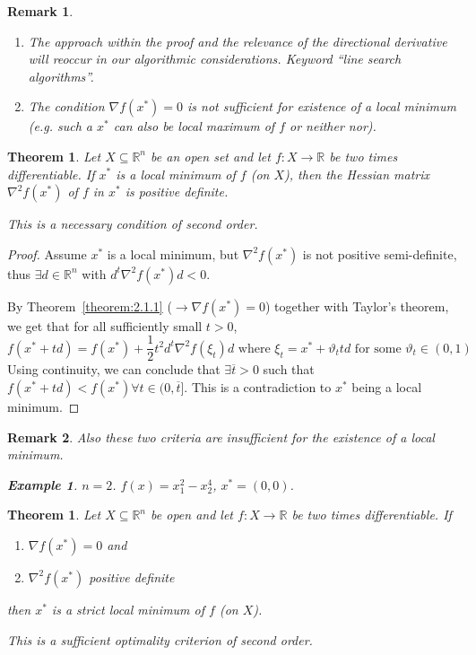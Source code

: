 \documentclass[a4paper]{article}
\newcounter{lecref}[subsection]
\numberwithin{lecref}{subsection}
\newtheorem{theorem}[lecref]{Theorem}
\newtheorem*{Example}{Example}
\newtheorem*{Remark}{Remark}
\begin{document}
\begin{Remark}
	\begin{enumerate}
		\item The approach within the proof and the relevance of the directional derivative will reoccur in our algorithmic considerations. Keyword \enquote{line search algorithms}.
		\item The condition $\nabla f(x^*) = 0$ is not sufficient for existence of a local minimum (e.g. such a $x^*$ can also be local maximum of $f$ or neither nor).
	\end{enumerate}
\end{Remark}

\begin{theorem}
	\label{theorem:2.1.2}
	Let $X \subseteq \mathbb R^n$ be an open set and let $f: X \to \mathbb R$ be two times differentiable.
	If $x^*$ is a local minimum of $f$ (on $X$), then the Hessian matrix $\nabla^2 f(x^*)$ of $f$ in $x^*$ is positive definite.

	This is a necessary condition of second order.
\end{theorem}

\begin{proof}
	Assume $x^*$ is a local minimum, but $\nabla^2 f(x^*)$ is not positive semi-definite, thus $\exists d \in \mathbb R^n$ with $d^t \nabla^2 f(x^*) d < 0$.

	By Theorem~\ref{theorem:2.1.1} ($\to \nabla f(x^*) = 0$) together with Taylor's theorem, we get that for all sufficiently small $t > 0$,
	\[ f(x^* + td) = f(x^*) + \frac12 t^2 d^t \nabla^2 f(\xi_t) d \text{ where } \xi_t = x^* + \vartheta _t td \text{ for some } \vartheta_t \in (0, 1) \]
	Using continuity, we can conclude that $\exists \overline{t} > 0$ such that $f(x^* + td) < f(x^*) \forall t \in (0, \overline{t}]$. This is a contradiction to $x^*$ being a local minimum.
\end{proof}

\begin{Remark}
	Also these two criteria are insufficient for the existence of a local minimum.
	\begin{Example}
		$n = 2$. $f(x) = x_1^2 - x_2^4$, $x^* = (0, 0)$.
	\end{Example}
\end{Remark}

\begin{theorem}
	\label{theorem:2.1.3}
	Let $X \subseteq \mathbb R^n$ be open and let $f: X \to \mathbb R$ be two times differentiable. If
	\begin{enumerate}
		\item $\nabla f(x^*) = 0$ and
		\item $\nabla^2 f(x^*)$ positive definite
	\end{enumerate}
	then $x^*$ is a strict local minimum of $f$ (on $X$).

	This is a sufficient optimality criterion of second order.
\end{theorem}
\end{document}
